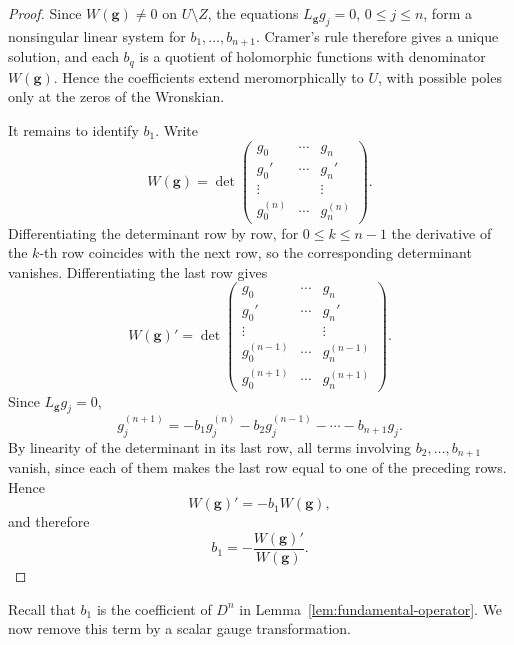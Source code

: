 \documentclass[12pt,letterpaper,reqno]{amsart}
\theoremstyle{definition}
\numberwithin{equation}{section}
\newcommand{\gv}{\bm g}
\begin{document}
\begin{proof}
Since \(W(\gv)\neq0\) on \(U\setminus Z\), the equations
\(L_{\gv}g_j=0\), \(0\le j\le n\), form a nonsingular linear system for
\(b_1,\ldots,b_{n+1}\). Cramer's rule therefore gives a unique solution, and
each \(b_q\) is a quotient of holomorphic functions with denominator
\(W(\gv)\). Hence the coefficients extend meromorphically to \(U\), with
possible poles only at the zeros of the Wronskian.

It remains to identify \(b_1\). Write
$$
W(\gv)=
\det
\begin{pmatrix}
g_0 & \cdots & g_{n}\\
g_0' & \cdots & g_{n}'\\
\vdots & & \vdots\\
g_0^{(n)} & \cdots & g_{n}^{(n)}
\end{pmatrix}.
$$
Differentiating the determinant row by row, for \(0\le k\le n-1\) the
derivative of the \(k\)-th row coincides with the next row, so the
corresponding determinant vanishes. Differentiating the last row gives
$$
W(\gv)'
=
\det
\begin{pmatrix}
g_0 & \cdots & g_{n}\\
g_0' & \cdots & g_{n}'\\
\vdots & & \vdots\\
g_0^{(n-1)} & \cdots & g_{n}^{(n-1)}\\
g_0^{(n+1)} & \cdots & g_{n}^{(n+1)}
\end{pmatrix}.
$$
Since \(L_{\gv}g_j=0\),
$$
g_j^{(n+1)}
=
-b_1g_j^{(n)}
-b_2g_j^{(n-1)}
-\cdots
-b_{n+1}g_j.
$$
By linearity of the determinant in its last row, all terms involving
\(b_2,\ldots,b_{n+1}\) vanish, since each of them makes the last row equal to
one of the preceding rows. Hence
$$
W(\gv)'=-b_1W(\gv),
$$
and therefore
$$
b_1=-\frac{W(\gv)'}{W(\gv)}.
$$
\end{proof}


Recall that \(b_1\) is the coefficient of \(D^{n}\) in
Lemma~\ref{lem:fundamental-operator}. We now remove this term by a scalar gauge
transformation.
\end{document}
